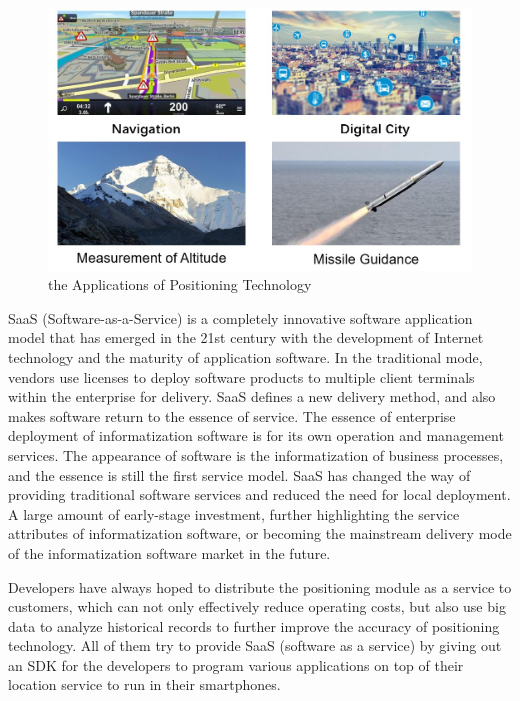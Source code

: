 \documentclass[conference]{IEEEtran}
\begin{document}
\begin{figure}[t]
	\centering
	\includegraphics[scale=0.4]{./figures/applications.jpg}
	\caption{the Applications of Positioning Technology}
	\label{fig:applications}
\end{figure}

SaaS (Software-as-a-Service) is a completely innovative software application model that has emerged in the 21st century with the development of Internet technology and the maturity of application software. In the traditional mode, vendors use licenses to deploy software products to multiple client terminals within the enterprise for delivery. SaaS defines a new delivery method, and also makes software return to the essence of service. The essence of enterprise deployment of informatization software is for its own operation and management services. The appearance of software is the informatization of business processes, and the essence is still the first service model. SaaS has changed the way of providing traditional software services and reduced the need for local deployment. A large amount of early-stage investment, further highlighting the service attributes of informatization software, or becoming the mainstream delivery mode of the informatization software market in the future.

Developers have always hoped to distribute the positioning module as a service to customers, which can not only effectively reduce operating costs, but also use big data to analyze historical records to further improve the accuracy of positioning technology. All of them try to provide SaaS (software as a service) by giving out an SDK for the developers to program various applications on top of their location service to run in their smartphones.\cite{intro-saas}
\end{document}
